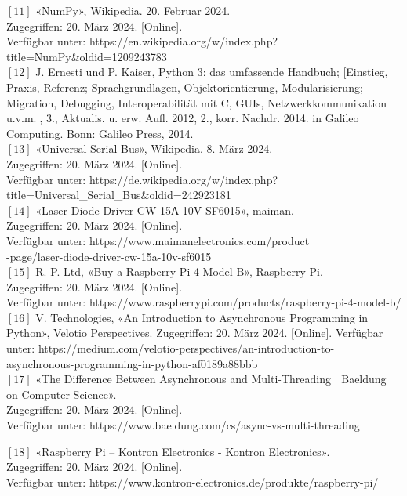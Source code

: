 $[11]$	«NumPy», Wikipedia. 20. Februar 2024.\\
Zugegriffen: 20. März 2024. [Online].\\
Verfügbar unter: https://en.wikipedia.org/w/index.php?title=NumPy&oldid=1209243783\\

$[12]$	J. Ernesti und P. Kaiser, Python 3: das umfassende Handbuch; [Einstieg, Praxis, Referenz; Sprachgrundlagen, Objektorientierung, Modularisierung; Migration, Debugging, Interoperabilität mit C, GUIs, Netzwerkkommunikation u.v.m.], 3., Aktualis. u. erw. Aufl. 2012, 2., korr. Nachdr. 2014. in Galileo Computing. Bonn: Galileo Press, 2014.\\

$[13]$	«Universal Serial Bus», Wikipedia. 8. März 2024.\\
Zugegriffen: 20. März 2024. [Online].\\
Verfügbar unter: https://de.wikipedia.org/w/index.php?\\ title=Universal\_Serial\_Bus&oldid=242923181\\

$[14]$	«Laser Diode Driver CW 15А 10V SF6015», maiman.\\
Zugegriffen: 20. März 2024. [Online].\\
Verfügbar unter: https://www.maimanelectronics.com/product\\
-page/laser-diode-driver-cw-15a-10v-sf6015\\

$[15]$ R. P. Ltd, «Buy a Raspberry Pi 4 Model B», Raspberry Pi.\\
Zugegriffen: 20. März 2024. [Online].\\
Verfügbar unter: https://www.raspberrypi.com/products/raspberry-pi-4-model-b/\\

$[16]$ V. Technologies, «An Introduction to Asynchronous Programming in Python», Velotio Perspectives. Zugegriffen: 20. März 2024. [Online]. Verfügbar unter: https://medium.com/velotio-perspectives/an-introduction-to-asynchronous-programming-in-python-af0189a88bbb\\

$[17]$ «The Difference Between Asynchronous and Multi-Threading | Baeldung on Computer Science».\\
Zugegriffen: 20. März 2024. [Online].\\
Verfügbar unter: https://www.baeldung.com/cs/async-vs-multi-threading

$[18]$ «Raspberry Pi – Kontron Electronics - Kontron Electronics».\\
Zugegriffen: 20. März 2024. [Online].\\
Verfügbar unter: https://www.kontron-electronics.de/produkte/raspberry-pi/


